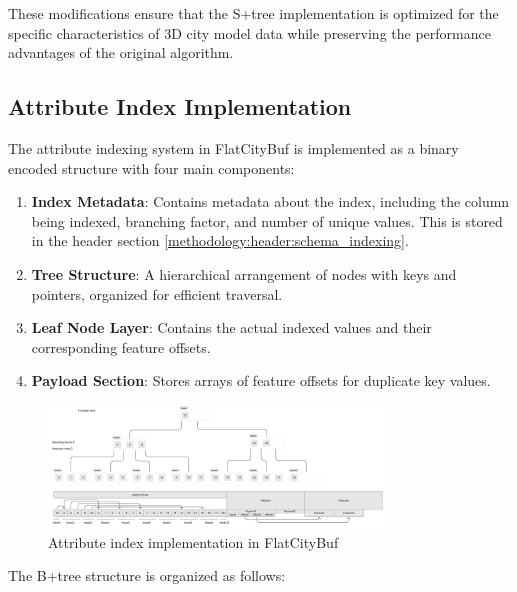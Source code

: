 These modifications ensure that the S+tree implementation is optimized for the specific characteristics of 3D city model data while preserving the performance advantages of the original algorithm.

\subsection{Attribute Index Implementation}
\label{methodology:attribute_index:implementation}

The attribute indexing system in FlatCityBuf is implemented as a binary encoded structure with four main components:

\begin{enumerate}
    \item \textbf{Index Metadata}: Contains metadata about the index, including the column being indexed, branching factor, and number of unique values. This is stored in the header section \autoref{methodology:header:schema_indexing}.
    \item \textbf{Tree Structure}: A hierarchical arrangement of nodes with keys and pointers, organized for efficient traversal.
    \item \textbf{Leaf Node Layer}: Contains the actual indexed values and their corresponding feature offsets.
    \item \textbf{Payload Section}: Stores arrays of feature offsets for duplicate key values.
\end{enumerate}

\begin{figure}[htbp]
  \centering
  \includegraphics[width=0.8\textwidth]{figs/methodology/attribute_index.png}
  \caption{Attribute index implementation in FlatCityBuf}
  \label{fig:methodology:attribute_index}
\end{figure}

The B+tree structure is organized as follows:

